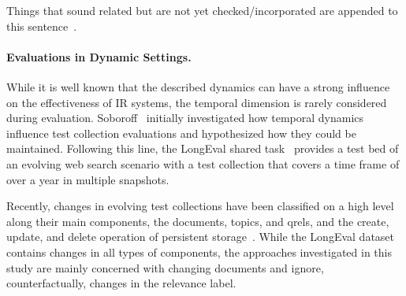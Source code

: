 Things that sound related but are not yet checked/incorporated are appended to this sentence~\cite{li:2022}.

\paragraph{Evaluations in Dynamic Settings.}
While it is well known that the described dynamics can have a strong influence on the effectiveness of IR systems, the temporal dimension is rarely considered during evaluation. Soboroff~\cite{DBLP:conf/sigir/Soboroff06} initially investigated how temporal dynamics influence test collection evaluations and hypothesized how they could be maintained. Following this line, the LongEval shared task~\cite{DBLP:conf/clef/AlkhalifaBDEAFG24,alkhalifa:2023} provides a test bed of an evolving web search scenario with a test collection that covers a time frame of over a year in multiple snapshots.

Recently, changes in evolving test collections have been classified on a high level along their main components, the documents, topics, and qrels, and the create, update, and delete operation of persistent storage~\cite{keller:2024}. While the LongEval dataset contains changes in all types of components, the approaches investigated in this study are mainly concerned with changing documents and ignore, counterfactually, changes in the relevance label.
